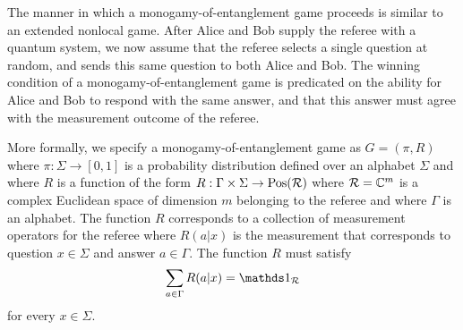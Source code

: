 The manner in which a monogamy-of-entanglement game proceeds is similar to an extended nonlocal game. After Alice and Bob supply the referee with a quantum system, we now assume that the referee selects a single question at random, and sends this same question to both Alice and Bob. The winning condition of a monogamy-of-entanglement game is predicated on the ability for Alice and Bob to respond with the same answer, and that this answer must agree with the measurement outcome of the referee.

More formally, we specify a monogamy-of-entanglement game as $G = (\pi,R)$ where $\pi : \Sigma \rightarrow \left[0,1\right]$ is a probability distribution defined over an alphabet $\Sigma$ and where $R$ is a function of the form $R : \Gamma \times \Sigma \rightarrow \mathrm{Pos}(\mathcal{R})$ where $\mathcal{R} = \mathbb{C}^m$ is a complex Euclidean space of dimension $m$ belonging to the referee and where $\Gamma$ is an alphabet. The function $R$ corresponds to a collection of measurement operators for the referee where $R(a|x)$ is the measurement that corresponds to question $x \in \Sigma$ and answer $a \in \Gamma$. The function $R$ must satisfy
\begin{align}
	\sum_{a \in \Gamma} R(a|x) = \I_{\R}
\end{align} 
for every $x \in \Sigma$.
 
